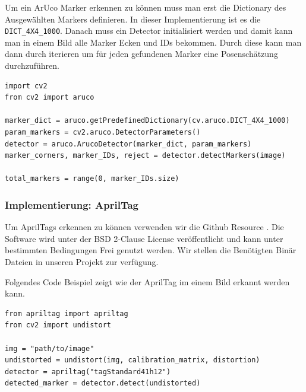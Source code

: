 Um ein ArUco Marker erkennen zu können muss man erst die Dictionary des Ausgewählten Markers definieren. 
In dieser Implementierung ist es die \texttt{DICT\_4X4\_1000}.
Danach muss ein Detector initialisiert werden und damit kann man in einem Bild alle Marker Ecken und IDs bekommen.
Durch diese kann man dann durch iterieren um für jeden gefundenen Marker eine Posenschätzung durchzuführen.



\begin{lstlisting}
import cv2
from cv2 import aruco

marker_dict = aruco.getPredefinedDictionary(cv.aruco.DICT_4X4_1000)
param_markers = cv2.aruco.DetectorParameters()
detector = aruco.ArucoDetector(marker_dict, param_markers)
marker_corners, marker_IDs, reject = detector.detectMarkers(image)

total_markers = range(0, marker_IDs.size)
\end{lstlisting}


\subsubsection{Implementierung: AprilTag}
Um AprilTags erkennen zu können verwenden wir die Github Resource \cite{apriltag_github}.
Die Software wird unter der BSD 2-Clause License veröffentlicht und kann unter bestimmten Bedingungen
Frei genutzt werden. Wir stellen die Benötigten Binär Dateien in unseren Projekt zur verfügung.

Folgendes Code Beispiel zeigt wie der AprilTag im einem Bild erkannt werden kann.


\begin{lstlisting}
from apriltag import apriltag
from cv2 import undistort

img = "path/to/image"
undistorted = undistort(img, calibration_matrix, distortion)
detector = apriltag("tagStandard41h12")
detected_marker = detector.detect(undistorted)
\end{lstlisting}


